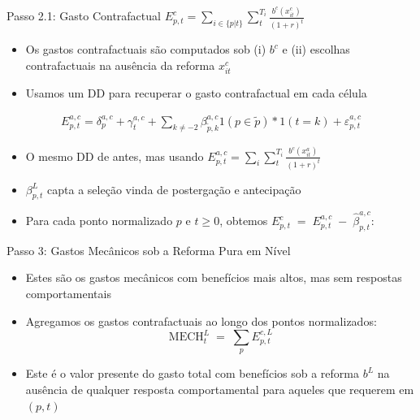 \begin{frame}{Passo 2.1: Gasto Contrafactual $E^{c}_{p,t}=\sum_{i \in \{p|t\}} \sum_t^{T_i} \frac{b^c(x^c_{it})}{(1+r)^t}$}
\begin{itemize}
    \item {Os gastos contrafactuais são computados sob (i) $b^c$ e (ii) escolhas contrafactuais na ausência da reforma $x_{it}^c$}
    
    \item {Usamos um DD para recuperar o gasto contrafactual em cada célula}
\end{itemize}    
    \begin{align*}
        {E^{a,c}_{p,t}=\delta_{p}^{a,c}+\gamma_t^{a,c} +\sum_{k\neq -2}\beta_{\tilde{p},k}^{a,c} 1(p\in \tilde p)*1(t=k)+\varepsilon_{p,t}^{a,c}}
    \end{align*}
\begin{itemize}    
    \item {O mesmo DD de antes, mas usando $E^{a,c}_{p,t}=\sum_i \sum_t^{T_i} \frac{b^c(x^a_{it})}{(1+r)^t}$}
    
    \item {$\beta^{L}_{p,t}$ capta a seleção vinda de postergação e antecipação}
    
    \item {Para cada ponto normalizado $p$ e $t\geq 0$, obtemos $E^{c}_{p,t}
        \;=\;
        E^{a,c}_{p,t}
        \;-\;
        \hat \beta^{a,c}_{p,t}$:}
\end{itemize}
\end{frame}

\begin{frame}{Passo 3: Gastos Mecânicos sob a Reforma Pura em Nível}
\begin{itemize}
    \item Estes são os gastos mecânicos com benefícios mais altos, mas sem respostas comportamentais
    
    
    \item Agregamos os {gastos contrafactuais} ao longo dos pontos normalizados:
    \[
        \text{MECH}^{L}_t
        \;=\;
        \sum_{p} {E^{c,L}_{p,t}}
    \]
    
    \item Este é o valor presente do gasto total com benefícios sob a reforma $b^L$ na ausência de qualquer resposta comportamental para aqueles que requerem em $(p,t)$
\end{itemize}
\end{frame}

